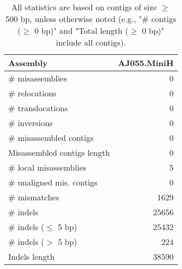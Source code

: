 \documentclass[12pt,a4paper]{article}
\begin{document}
\begin{table}[ht]
\begin{center}
\caption{All statistics are based on contigs of size $\geq$ 500 bp, unless otherwise noted (e.g., "\# contigs ($\geq$ 0 bp)" and "Total length ($\geq$ 0 bp)" include all contigs).}
\begin{tabular}{|l*{1}{|r}|}
\hline
Assembly & AJ055.MiniH \\ \hline
\# misassemblies & 0 \\ \hline
\hspace{5mm}\# relocations & 0 \\ \hline
\hspace{5mm}\# translocations & 0 \\ \hline
\hspace{5mm}\# inversions & 0 \\ \hline
\# misassembled contigs & 0 \\ \hline
Misassembled contigs length & 0 \\ \hline
\# local misassemblies & 5 \\ \hline
\# unaligned mis. contigs & 0 \\ \hline
\# mismatches & 1629 \\ \hline
\# indels & 25656 \\ \hline
\hspace{5mm}\# indels ($\leq$ 5 bp) & 25432 \\ \hline
\hspace{5mm}\# indels ($>$ 5 bp) & 224 \\ \hline
Indels length & 38590 \\ \hline
\end{tabular}
\end{center}
\end{table}
\end{document}
